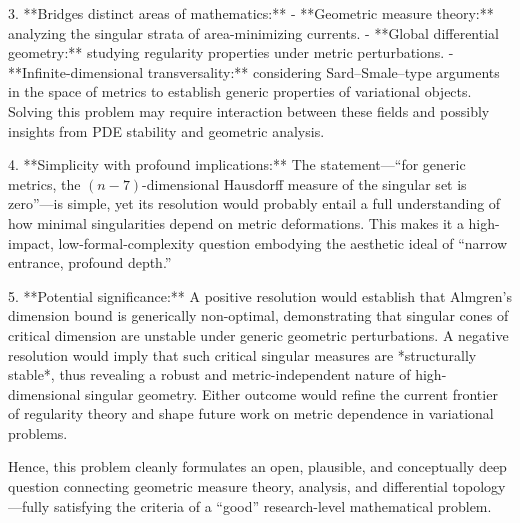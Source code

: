 3. **Bridges distinct areas of mathematics:**  
   - **Geometric measure theory:** analyzing the singular strata of area-minimizing currents.  
   - **Global differential geometry:** studying regularity properties under metric perturbations.  
   - **Infinite-dimensional transversality:** considering Sard–Smale–type arguments in the space of metrics to establish generic properties of variational objects.  
   Solving this problem may require interaction between these fields and possibly insights from PDE stability and geometric analysis.

4. **Simplicity with profound implications:**  
   The statement—“for generic metrics, the \((n−7)\)-dimensional Hausdorff measure of the singular set is zero”—is simple, yet its resolution would probably entail a full understanding of how minimal singularities depend on metric deformations. This makes it a high-impact, low-formal-complexity question embodying the aesthetic ideal of “narrow entrance, profound depth.”

5. **Potential significance:**  
   A positive resolution would establish that Almgren’s dimension bound is generically non-optimal, demonstrating that singular cones of critical dimension are unstable under generic geometric perturbations.  
   A negative resolution would imply that such critical singular measures are *structurally stable*, thus revealing a robust and metric-independent nature of high-dimensional singular geometry.  
   Either outcome would refine the current frontier of regularity theory and shape future work on metric dependence in variational problems.

Hence, this problem cleanly formulates an open, plausible, and conceptually deep question connecting geometric measure theory, analysis, and differential topology—fully satisfying the criteria of a “good” research-level mathematical problem.